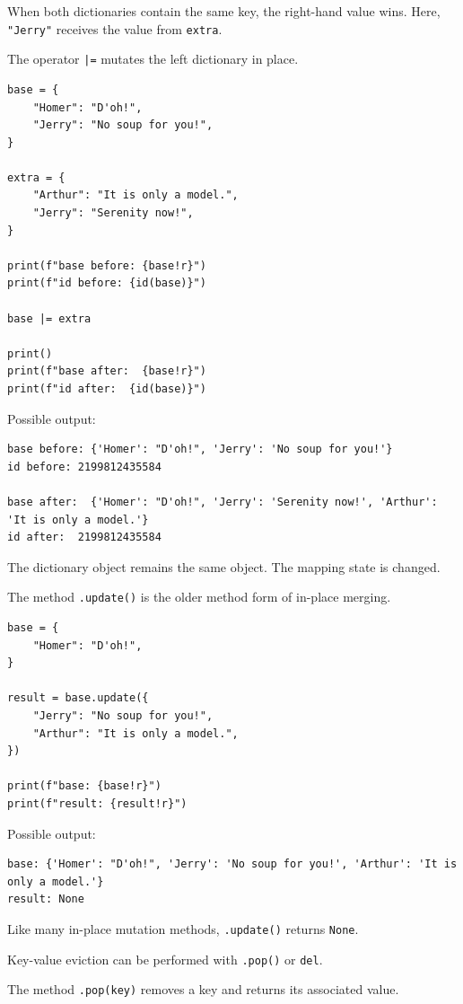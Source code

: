 When both dictionaries contain the same key, the right-hand value wins. Here, \texttt{"Jerry"} receives the value from \texttt{extra}.

The operator \texttt{|=} mutates the left dictionary in place.

\begin{verbatim}
base = {
    "Homer": "D'oh!",
    "Jerry": "No soup for you!",
}

extra = {
    "Arthur": "It is only a model.",
    "Jerry": "Serenity now!",
}

print(f"base before: {base!r}")
print(f"id before: {id(base)}")

base |= extra

print()
print(f"base after:  {base!r}")
print(f"id after:  {id(base)}")
\end{verbatim}

Possible output:

\begin{verbatim}
base before: {'Homer': "D'oh!", 'Jerry': 'No soup for you!'}
id before: 2199812435584

base after:  {'Homer': "D'oh!", 'Jerry': 'Serenity now!', 'Arthur': 'It is only a model.'}
id after:  2199812435584
\end{verbatim}

The dictionary object remains the same object. The mapping state is changed.

The method \texttt{.update()} is the older method form of in-place merging.

\begin{verbatim}
base = {
    "Homer": "D'oh!",
}

result = base.update({
    "Jerry": "No soup for you!",
    "Arthur": "It is only a model.",
})

print(f"base: {base!r}")
print(f"result: {result!r}")
\end{verbatim}

Possible output:

\begin{verbatim}
base: {'Homer': "D'oh!", 'Jerry': 'No soup for you!', 'Arthur': 'It is only a model.'}
result: None
\end{verbatim}

Like many in-place mutation methods, \texttt{.update()} returns \texttt{None}.

Key-value eviction can be performed with \texttt{.pop()} or \texttt{del}.

The method \texttt{.pop(key)} removes a key and returns its associated value.

